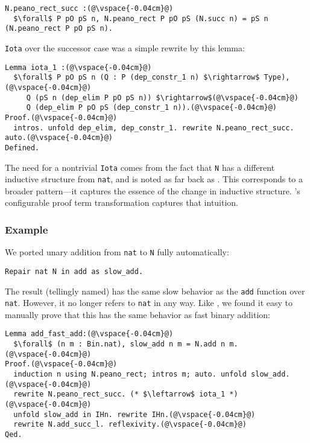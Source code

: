 \begin{lstlisting}
N.peano_rect_succ :(@\vspace{-0.04cm}@)
  $\forall$ P pO pS n, N.peano_rect P pO pS (N.succ n) = pS n (N.peano_rect P pO pS n).
\end{lstlisting}
\lstinline{Iota} over the successor case was a simple rewrite by this lemma:

\begin{lstlisting}
Lemma iota_1 :(@\vspace{-0.04cm}@)
  $\forall$ P pO pS n (Q : P (dep_constr_1 n) $\rightarrow$ Type),(@\vspace{-0.04cm}@)
     Q (pS n (dep_elim P pO pS n)) $\rightarrow$(@\vspace{-0.04cm}@)
     Q (dep_elim P pO pS (dep_constr_1 n)).(@\vspace{-0.04cm}@)
Proof.(@\vspace{-0.04cm}@)
  intros. unfold dep_elim, dep_constr_1. rewrite N.peano_rect_succ. auto.(@\vspace{-0.04cm}@)
Defined.
\end{lstlisting}

The need for a nontrivial \lstinline{Iota} comes from the fact that \lstinline{N} has a different
inductive structure from \lstinline{nat}, and is noted as far back as \citet{magaud2000changing}.
This corresponds to a broader pattern---it captures the essence of the change in inductive structure.
\toolname's configurable proof term transformation captures that intuition.

\subsubsection{Example}

We ported unary addition from \lstinline{nat} to \lstinline{N} fully automatically:

\begin{lstlisting}
Repair nat N in add as slow_add.
\end{lstlisting}
The result (tellingly named) has the same slow behavior as the \lstinline{add} function over \lstinline{nat}.
However, it no longer refers to \lstinline{nat} in any way.
Like \citet{magaud2000changing}, we found it easy to manually prove that
this has the same behavior as fast binary addition:

\begin{lstlisting}
Lemma add_fast_add:(@\vspace{-0.04cm}@)
  $\forall$ (n m : Bin.nat), slow_add n m = N.add n m.(@\vspace{-0.04cm}@)
Proof.(@\vspace{-0.04cm}@)
  induction n using N.peano_rect; intros m; auto. unfold slow_add.(@\vspace{-0.04cm}@)
  rewrite N.peano_rect_succ. (* $\leftarrow$ iota_1 *)(@\vspace{-0.04cm}@)
  unfold slow_add in IHn. rewrite IHn.(@\vspace{-0.04cm}@)
  rewrite N.add_succ_l. reflexivity.(@\vspace{-0.04cm}@)
Qed.
\end{lstlisting}

